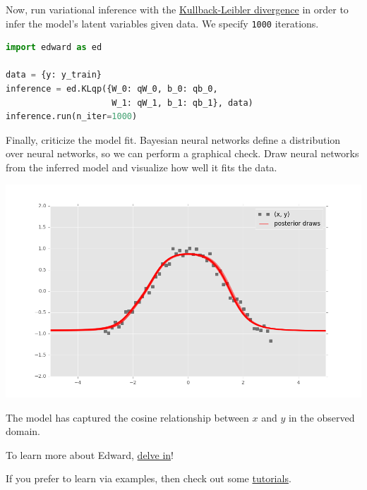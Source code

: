 Now, run variational inference with the
\href{https://en.wikipedia.org/wiki/Kullback–Leibler_divergence}{Kullback-Leibler divergence}
in order to infer the model's latent variables given data.
We specify \texttt{1000} iterations.

\begin{lstlisting}[language=Python]
import edward as ed

data = {y: y_train}
inference = ed.KLqp({W_0: qW_0, b_0: qb_0,
                     W_1: qW_1, b_1: qb_1}, data)
inference.run(n_iter=1000)
\end{lstlisting}

Finally, criticize the model fit. Bayesian neural networks define a distribution
over neural networks, so we can perform a graphical check. Draw neural networks
from the inferred model and visualize how well it fits the data.

\includegraphics[width=700px]{images/getting-started-fig1.png}

The model has captured the cosine relationship between $x$ and $y$
in the observed domain.

To learn more about Edward, \href{/api}{delve in}!

If you prefer to learn via examples, then check out some
\href{/tutorials/}{tutorials}.
